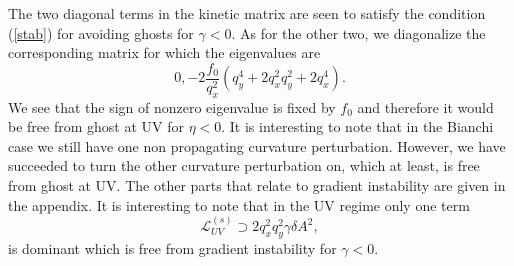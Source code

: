\documentclass[%
 reprint,
 amsmath,amssymb,
 aps,
]{revtex4-1}
\begin{document}
The two diagonal terms in the kinetic matrix are seen to satisfy the condition (\ref{stab}) for avoiding ghosts  for $\gamma<0$. As for the other two, we  diagonalize the corresponding matrix for which the  eigenvalues are
\begin{equation}
 0, -2 \frac{f_0}{q_x^2}(q_y^4+2q_x^2q_y^2+2q_x^4).
\end{equation}
We see that  the sign of nonzero eigenvalue is fixed by $f_0$ and therefore it would be free from ghost at UV for $\eta<0$. It is interesting to note that in the Bianchi case  we still have one non propagating curvature perturbation. However, we have succeeded to turn the other curvature perturbation on,  which at least, is free from ghost at UV.
The other parts that relate to gradient instability are given in the appendix. It is interesting to note that in the UV regime only one term
\begin{equation}
\mathcal{L}_{UV}^{(s)}\supset 2q_x^2q_y^2\gamma \delta A^2,
\end{equation}
is dominant which is free from gradient instability for $\gamma<0$.
\end{document}
